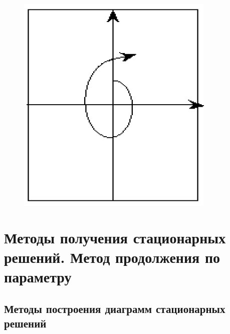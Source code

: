 \begin{figure}[H]
\begin{minipage}{0.25\textwidth}
		\end{minipage}
		\begin{minipage}{0.25\textwidth}
			\includegraphics[width=\textwidth]{img/10_08}
		\end{minipage}
	\end{figure}
	
	\newpage
	
	\section {Методы получения стационарных решений. Метод продолжения по параметру}
	\subsection{Методы построения диаграмм стационарных решений}
	
